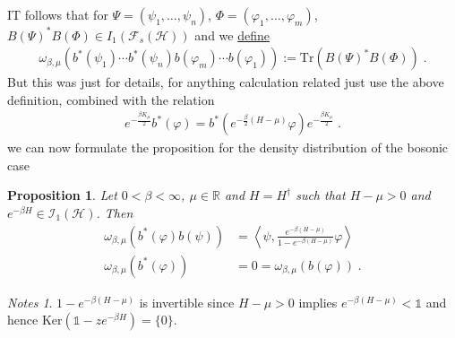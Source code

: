 \documentclass[
a4paper, %
11pt, %
onecolumn, %
openany, %
]{memoir}
\theoremstyle{definition}
\theoremstyle{remark}
\newtheorem{notes}{Notes}[chapter]
\theoremstyle{plain}
\newtheorem{prop}{Proposition}[chapter]
\begin{document}
IT follows that for $\Psi=(\psi_1,\ldots,\psi_n)$, $\Phi=(\varphi_1,\ldots,\varphi_m)$, $B(\Psi)^*B(\Phi)\in I_1(\mathcal{F}_s(\mathcal{H}))$ and we \underline{define}\begin{align}
\omega_{\beta,\mu}(b^*(\psi_1)\cdots b^*(\psi_n)b(\varphi_m)\cdots b(\varphi_1)):=\mathrm{Tr}(B(\Psi)^*B(\Phi))\;.
\end{align}
But this was just for details, for anything calculation related just use the above definition, combined with the relation\begin{align}
e^{-\frac{\beta K_{\mu}}{2}}b^*(\varphi)=b^*(e^{-\frac{\beta }{2}(H-\mu)}\varphi)e^{-\frac{\beta K_{\mu}}{2}}\; .\label{eqn::boson_relation}
\end{align} we can now formulate the proposition for the density distribution of the bosonic case
\begin{prop} Let $0<\beta<\infty$, $\mu\in\mathbb{R}$ and $H=H^{\dagger}$ such that $H-\mu>0$ and $e^{-\beta H}\in \mathcal{I_1(\mathcal{H})}$. Then \begin{align}
\omega_{\beta,\mu}(b^*(\varphi)b(\psi))&=\left\langle\psi, \frac{e^{-\beta(H-\mu)}}{1-e^{-\beta(H-\mu)}}\varphi\right\rangle\\
\omega_{\beta,\mu}(b^*(\varphi))&=0=\omega_{\beta,\mu}(b(\varphi))\; .
\end{align}
\end{prop}
\begin{notes}
	$1-e^{-\beta(H-\mu)}$ is invertible since $H-\mu>0$ implies $e^{-\beta(H-\mu)}<\mathds{1}$ and hence $\mathrm{Ker}(\mathds{1}-ze^{-\beta H})=\{0\}$.
\end{notes}
\end{document}
